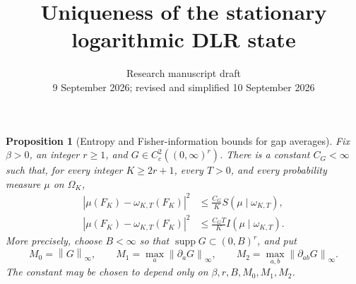 \documentclass[11pt,reqno]{amsart}
\title[Uniqueness of the logarithmic DLR state]{Uniqueness of the stationary logarithmic DLR state}
\date{Research manuscript draft\\9 September 2026; revised and simplified 10 September 2026}
\numberwithin{equation}{section}
\newtheorem{proposition}[theorem]{Proposition}
\theoremstyle{definition}
\theoremstyle{remark}
\newcommand{\1}{\mathbf 1}
\newcommand{\norm}[1]{\left\lVert #1\right\rVert}
\DeclareMathOperator{\supp}{supp}
\begin{document}
\begin{proposition}[Entropy and Fisher-information bounds for gap averages]\label{prop:gap-entropy}
Fix $\beta>0$, an integer $r\ge1$, and $G\in C_c^2((0,\infty)^r)$.
There is a constant $C_G<\infty$ such that, for every integer
$K\ge2r+1$, every $T>0$, and every probability measure $\mu$ on
$\Omega_K$,
\begin{align}
|\mu(F_K)-\omega_{K,T}(F_K)|^2
&\le \frac{C_G}{K}S(\mu\mid\omega_{K,T}),\label{eq:entropy-gap}\\
|\mu(F_K)-\omega_{K,T}(F_K)|^2
&\le \frac{C_GT}{K}I(\mu\mid\omega_{K,T}).\label{eq:fisher-gap}
\end{align}
More precisely, choose $B<\infty$ so that
$\supp G\subset(0,B)^r$, and put
\[
M_0=\norm G_\infty,\qquad
M_1=\max_a\norm{\partial_aG}_\infty,\qquad
M_2=\max_{a,b}\norm{\partial_{ab}G}_\infty.
\]
The constant may be chosen to depend only on
$\beta,r,B,M_0,M_1,M_2$.
\end{proposition}
\end{document}
